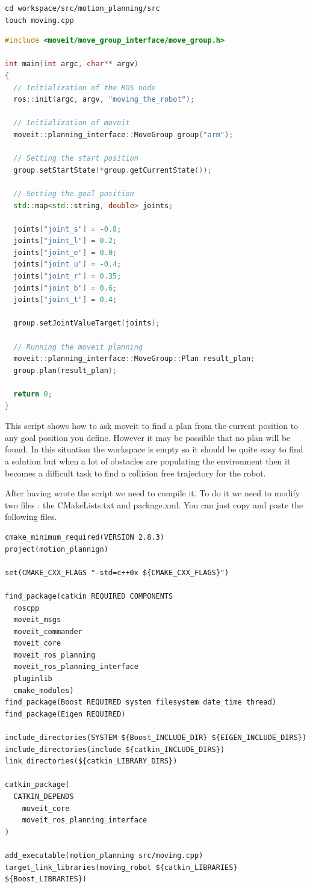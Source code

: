 \begin{lstlisting}
cd workspace/src/motion_planning/src
touch moving.cpp
\end{lstlisting}

\begin{lstlisting}[language=c++,caption=moving.cpp]
#include <moveit/move_group_interface/move_group.h>

int main(int argc, char** argv)
{
  // Initialization of the ROS node
  ros::init(argc, argv, "moving_the_robot");

  // Initialization of moveit 
  moveit::planning_interface::MoveGroup group("arm");

  // Setting the start position
  group.setStartState(*group.getCurrentState());

  // Setting the goal position
  std::map<std::string, double> joints;
      
  joints["joint_s"] = -0.8;
  joints["joint_l"] = 0.2;
  joints["joint_e"] = 0.0;
  joints["joint_u"] = -0.4;
  joints["joint_r"] = 0.35;
  joints["joint_b"] = 0.6;
  joints["joint_t"] = 0.4;
      
  group.setJointValueTarget(joints);

  // Running the moveit planning
  moveit::planning_interface::MoveGroup::Plan result_plan;
  group.plan(result_plan);
  
  return 0;
}
\end{lstlisting}


This script shows how to ask moveit to find a plan from the current position to any goal position you define. However it may be possible that no plan will be found. In this situation the workspace is empty so it should be quite easy to find a solution but when a lot of obstacles are populating the environment then it becomes a difficult task to find a collision free trajectory for the robot.

After having wrote the script we need to compile it. To do it we need to modify two files : the CMakeLists.txt and package.xml. You can just copy and paste the following files.


\begin{lstlisting}[caption=CMakeLists.txt]
cmake_minimum_required(VERSION 2.8.3)
project(motion_plannign)

set(CMAKE_CXX_FLAGS "-std=c++0x ${CMAKE_CXX_FLAGS}")

find_package(catkin REQUIRED COMPONENTS
  roscpp
  moveit_msgs
  moveit_commander
  moveit_core
  moveit_ros_planning
  moveit_ros_planning_interface
  pluginlib
  cmake_modules)
find_package(Boost REQUIRED system filesystem date_time thread)
find_package(Eigen REQUIRED)

include_directories(SYSTEM ${Boost_INCLUDE_DIR} ${EIGEN_INCLUDE_DIRS})
include_directories(include ${catkin_INCLUDE_DIRS})
link_directories(${catkin_LIBRARY_DIRS})

catkin_package(
  CATKIN_DEPENDS
    moveit_core
    moveit_ros_planning_interface
)

add_executable(motion_planning src/moving.cpp)
target_link_libraries(moving_robot ${catkin_LIBRARIES} ${Boost_LIBRARIES})
\end{lstlisting}



